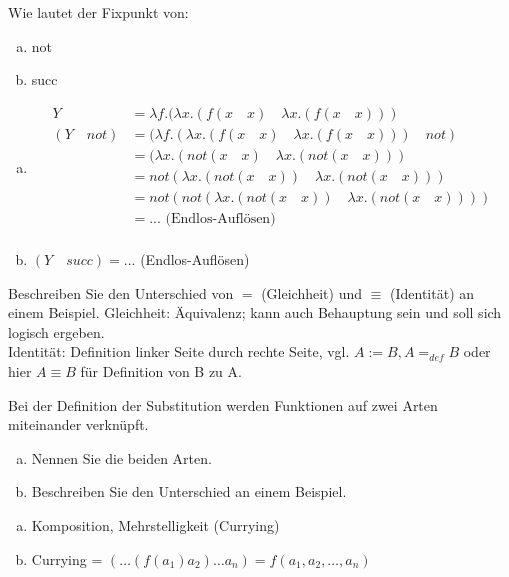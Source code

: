 \begin{card}
	Wie lautet der Fixpunkt von:
	\begin{enumerate}[a)]
    \item not
    \item succ
	\end{enumerate}
	\hr
	\begin{enumerate}[a)]
    \item
      \begin{align*}
        Y &= \lambda f.(\lambda x.(f(x \quad x) \quad \lambda x.(f(x \quad x))) \\
        (Y \quad not) &= (\lambda f.(\lambda x.(f(x \quad x) \quad \lambda x.(f(x \quad x))) \quad not) \\
        &= (\lambda x.(not(x \quad x) \quad \lambda x.(not(x \quad x))) \\
        &= not(\lambda x.(not(x \quad x)) \quad \lambda x.(not(x \quad x))) \\
        &= not(not(\lambda x.(not(x \quad x)) \quad \lambda x.(not(x \quad x)))) \\
        &= ... \text{ (Endlos-Auflösen)} \\
      \end{align*}
    \item $(Y \quad succ) = ...$ (Endlos-Auflösen)
	\end{enumerate}
\end{card}

\begin{card}
	Beschreiben Sie den Unterschied von $=$ (Gleichheit) und $\equiv$ (Identität) an einem Beispiel.
	\hr
	Gleichheit: Äquivalenz; kann auch Behauptung sein und soll sich logisch ergeben.\\
	Identität: Definition linker Seite durch rechte Seite, vgl. $A := B, A=_{def} B$ oder hier $A \equiv B $ für Definition von B zu A.
\end{card}

\begin{card}
	Bei der Definition der Substitution werden Funktionen auf zwei Arten miteinander verknüpft.
  \begin{enumerate}[a)]
	  \item Nennen Sie die beiden Arten.
	  \item Beschreiben Sie den Unterschied an einem Beispiel.
	\end{enumerate}
	\hr
  \begin{enumerate}[a)]
	  \item Komposition, Mehrstelligkeit (Currying)
	  \item Currying = $(\dots (f(a_1)a_2) \dots a_n) = f(a_1,a_2, \dots, a_n)$
	\end{enumerate}
\end{card}
